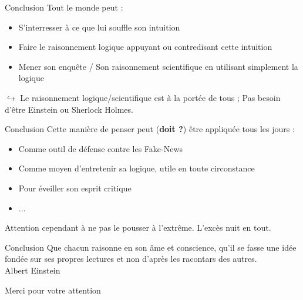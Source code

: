 \documentclass[11pt]{beamer}
\begin{document}
\begin{frame}{Conclusion}
Tout le monde peut : 
\begin{itemize}
	\item S'interresser à ce que lui souffle son intuition \pause
	\item Faire le raisonnement logique appuyant ou contredisant cette intuition \pause 
	\item Mener son enquête / Son raisonnement scientifique en utilisant simplement la logique
\end{itemize}
\pause $\hookrightarrow$ Le raisonnement logique/scientifique est à la portée de tous ; Pas besoin d'être Einstein ou Sherlock Holmes.
\end{frame} 
\begin{frame}{Conclusion}
	Cette manière de penser peut (\textbf{doit ?}) être appliquée tous les jours \pause : 
	\begin{itemize}
		\item Comme outil de défense contre les Fake-News
		\item Comme moyen d'entretenir sa logique, utile en toute circonstance
		\item Pour éveiller son esprit critique
		\item ...
	\end{itemize}

\pause Attention cependant à ne pas le pousser à l'extrême. L'excès nuit en tout.
\end{frame}
\begin{frame}{Conclusion}
	Que chacun raisonne en son âme et conscience, qu'il se fasse une idée fondée sur ses propres lectures et non d'après les racontars des autres. \vspace{1cm} \\ Albert Einstein
\end{frame}
\begin{frame}
	\begin{center}
		\Huge{Merci pour votre attention}
	\end{center}
\end{frame}
\end{document}
